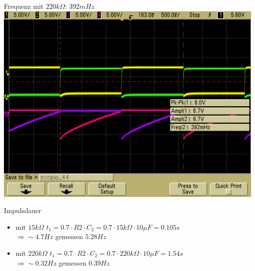 \documentclass[compress,11pt]{beamer}
\begin{document}
\begin{frame}
Frequenz mit $220k\Omega$: $392mHz$
\includegraphics[width=.7\textwidth]{scope_44.png}
\end{frame}
\begin{frame}
\begin{block}{Impulsdauer}
\begin{itemize}
 \item mit $15k\Omega$ $t_1=0.7\cdot R2 \cdot C_2 = 0.7 \cdot 15k\Omega \cdot 10\mu F=0.105 s$ \\
 $\Rightarrow \sim 4.7 Hz$ gemessen $5.28Hz$
 \item mit $220k\Omega$ $t_1=0.7\cdot R2 \cdot C_2 = 0.7 \cdot 220k\Omega \cdot 10\mu F=1.54 s$\\
 $\Rightarrow \sim 0.32 Hz$ gemessen $0.39Hz$
\end{itemize}
\end{block}
\end{frame}
\end{document}
